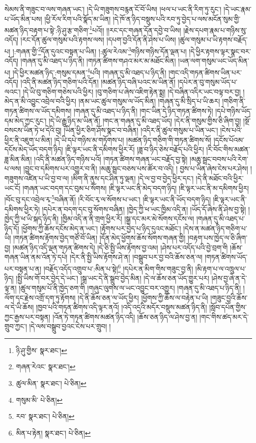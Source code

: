 སེམས་ནི་གཟུང་བ་ལས་གཞན་ཡང་། །དེ་ཡི་གཟུགས་བརྙན་ངོ་བོ་ཡིས། །ཕལ་པ་ཡང་ནི་རིག་ཏུ་རུང་། །དེ་ཡང་རྣམ་པ་ཡོད་མིན་པས། །ཕྱི་རོལ་རིག་པའི་སྣོད་མ་ཡིན། །དེ་ཁོ་ན་ཉིད་བསྡུས་པའི་རབ་ཏུ་བྱེད་པ་ལས་མངོན་སུམ་གྱི་མཚན་ཉིད་བརྟག་པ་སྟེ་:ཉི་ཤུ་རྩ་གཅིག་\footnote{ཉི་ཤུ་གྱིས་  སྣར་ཐང་། }པའོ།། །།རང་དང་གཞན་དོན་དབྱེ་བ་ཡིས། །རྗེས་དཔག་རྣམ་པ་གཉིས་སུ་འདོད། །རང་དོན་ཚུལ་གསུམ་པའི་རྟགས་ལས། །དཔག་བྱའི་དོན་ནི་ཤེས་པ་ཡིས། །ཚུལ་གསུམ་པ་ཡི་རྟགས་བརྗོད་པ། །:གཞན་གྱི་\footnote{གཞན་རེའང་  སྣར་ཐང་། }དོན་དུའང་བསྟན་པ་ཡིན། །:ཚུལ་རེའམ་\footnote{ཚུལ་མིན་  སྣར་ཐང་།  པེ་ཅིན། }གཉིས་གཉིས་དོན་ལྡན་པ། །དེ་ཕྱིར་རྟགས་ལྟར་སྣང་བར་འདོད། །གཞན་དུ་མི་འཐད་པ་ཉིད་ནི། །གཏན་ཚིགས་གཤའ་མར་མ་མཐོང་མིན། །ཡན་ལག་གསུམ་ཡང་ཡོད་མིན་པ། །དེ་ཕྱིར་མཚན་ཉིད་:གསུམ་དམན་\footnote{གསུམ་མི་  པེ་ཅིན། }པའི། །གཞན་དུ་མི་འཐད་པ་ཉིད་ནི། །གང་འདི་གཏན་ཚིགས་ཡིན་པར་འདོད། །འདི་ནི་མཚན་ཉིད་གཅིག་པའི་དོན། །མཚན་ཉིད་བཞི་པའང་མ་ཡིན་ནོ། །དཔེར་ན་བུ་གསུམ་ཡོད་པ་ལའང་། །དེ་ཡི་བུ་གཅིག་གཅེས་པའི་ཕྱིར། །བུ་གཅིག་པ་ཞེས་འཇིག་རྟེན་སྨྲ། །དེ་བཞིན་འདིར་ཡང་བལྟ་བར་བྱ། །མེད་ན་མི་འབྱུང་འབྲེལ་བའི་ཕྱིར། །ནམ་ཡང་ཚུལ་གསུམ་ལ་ཡོད་མིན། །གཞན་དུ་མི་སྲིད་པ་ཡི་ཆར། །གཅིག་ནི་གཏན་ཚིགས་ལ་ཡོད་དམིགས། །གཞན་དུ་མི་འཐད་པ་ཉིད་ནི། །གང་ཡིན་དེ་ཉིད་གཏན་ཚིགས་ཏེ། །དཔེ་གཉིས་ཡོད་དམ་མེད་ཀྱང་རུང་། །དེ་ཡི་རྒྱུ་ཉིད་མ་ཡིན་ནོ། །གང་ན་གཞན་དུ་མི་འཐད་ཡོད། །དེར་ནི་གསུམ་གྱིས་ཅི་ཞིག་བྱ། །སྔོ་བསངས་ཡིན་ཏེ་ཕ་དེའི་བུ། །ཡིན་ཕྱིར་ཅིག་ཤོས་སྣང་བ་བཞིན། །འདིར་ནི་ཚུལ་གསུམ་པ་ཡིན་ཡང་། །ངེས་པའི་ཕྱིར་ནི་འཇུག་པ་མིན། །དེ་ཡི་དཔེ་གཉིས་མ་གཏོགས་པ། །མཚན་ཉིད་གཅིག་གི་གཏན་ཚིགས་སོ། །དངོས་པོའམ་དངོས་མེད་ཡོད་བདག་ཉིད། །ཇི་ལྟར་ཡང་ནི་དམིགས་ཕྱིར་རོ། །ཟླ་བ་ཉིད་ཅེས་བརྗོད་པའི་ཕྱིར། །རི་བོང་གིས་མཚན་ཟླ་མིན་མིན། །འདི་ནི་མཚན་ཉིད་གཉིས་པའོ། །གཏན་ཚིགས་གཞན་ཡང་བརྗོད་བྱ་སྟེ། །མཆུ་སྦྲང་བབས་པའི་རེག་པ་ལས། །བྱུང་བ་དམིགས་པར་འགྱུར་བ་ནི། །མཆུ་སྦྲང་བཅས་པས་ཚོར་བ་འདི། །
བྱས་པ་ཡིན་ཞེས་ངེས་པར་ཤེས། །གཟུགས་འཛིན་པ་ཡི་བྱ་བ་ལ། །མིག་ནི་ནུས་དང་ཤིན་ཏུ་ལྡན། །དེ་ལ་བྱ་བ་བྱེད་ཕྱིར་དང་། །དེ་ནི་མཐོང་བའི་ཕྱིར་ཡང་ངོ། །གཞན་ཡང་བདག་དང་བུམ་པ་སོགས། །ཇི་ལྟར་ཡང་ནི་མེད་བདག་ཉིད། །ཇི་ལྟར་ཡང་ནི་མ་དམིགས་ཕྱིར། །བོང་བུ་དང་འབྲེལ་རྭ་\footnote{རབ་  སྣར་ཐང་།  པེ་ཅིན། }བཞིན་ནོ། །རི་བོང་རྭ་ལ་སོགས་པ་ཡང་། །ཇི་ལྟར་ཡང་ནི་ཡོད་བདག་ཉིད། །ཇི་ལྟར་ཡང་ནི་དམིགས་ཕྱིར་ཏེ། །དཔེར་ན་བདག་དང་བུ་སོགས་བཞིན། །ཁྱེད་ཀྱི་ཕ་ཡང་ཁྱིམ་འདི་ན། །ཡོད་དོ་ཞེས་ནི་ཤེས་བྱ་སྟེ། །ཁྱེད་ཀྱི་ཕ་ཡི་སྐད་ཉིད་ནི། །ཁྱིམ་འདི་ན་ནི་གྲག་ཕྱིར་རོ། །སྒྲ་དང་མར་མེ་སོགས་དངོས་ལ། །གཞན་དུ་མི་འཐད་པ་ཉིད་དོ། །ཕྱོགས་ཀྱི་ཆོས་དངོས་མེད་ན་ཡང་། །རྟོགས་པར་བྱེད་པ་ཉིད་དུའང་མཐོང་། །དེས་ན་མཚན་ཉིད་གཅིག་པ་ཡི། །གཏན་ཚིགས་རྟོགས་བྱེད་གཙོ་བོ་ཡིན། །དོན་མེད་ཕྱོགས་ཆོས་སོགས་གཞན་གྱི། །བརྟག་པས་ཁྱེད་ལ་ཅི་ཞིག་བྱ། །མཚན་ཉིད་འདི་ལྡན་གཏན་ཚིགས་དེ། །དེ་ཅི་སྤྱི་ཡིས་རྟོགས་བྱ་འམ། །ཤེས་པར་འདོད་པའི་བྱེ་བྲག་གི །ཆོས་གཞན་ཡིན་ནམ་འོན་ཏེ་དཔེ། །དེར་ནི་སྤྱི་ཡིས་རྟོགས་ཤེ་ན། །བསྒྲུབ་པར་བྱ་བའི་ཆོས་ཅན་ལ། །གཏན་ཚིགས་ཡོད་པར་བསྟན་པ་ན། །བརྗོད་འདོད་འགྲུབ་པ་:མིན་པ་སྟེ།\footnote{མིན་པ་རྟེན།  སྣར་ཐང་།  པེ་ཅིན། } །དཔེར་ན་མིག་གིས་གཟུང་བྱ་ནི། །མི་རྟག་པ་ལ་འཁྲུལ་པ་ཉིད། །སྤྱི་ཡིས་གོ་བར་བྱེད་དེ་ཡང་། །སྒྲ་ཡང་དེ་ནི་སྒྲུབ་བྱེད་མིན། །དེ་ལ་ཆོས་ཅན་ཡོད་གྱུར་པར། །ཤེས་བྱ་ཞེ་ན་དེ་ལྟ་ན། །ཚུལ་གསུམ་པོ་ནི་ཁྱེད་ཅག་གི །གཞུང་ལུགས་ལ་ཡང་འབྱུང་བར་འགྱུར། །གཞན་དུ་མི་འཐད་པ་ཉིད་ནི། །ལོག་དང་རྗེས་འགྲོ་དག་ཏུ་རྟོགས། །དེ་ནི་ཆོས་ཅན་ལ་ཡོད་ཕྱིར། །ཕྱོགས་ཀྱི་ཆོས་ལ་བརྟེན་པ་ཡི། །གཟུང་བྱའི་ཆོས་ལ་དེ་ཡི་ཆོས། །ཁྱབ་པའི་གཏན་ཚིགས་འདི་ལྟར་ནའོ། །འདི་འདྲའི་མདོར་བསྡུས་མཚན་ཉིད་ནི། །སློབ་དཔོན་གྱིས་ཀྱང་རྒྱས་པར་བསྟན། །འོན་ཏེ་གཏན་ཚིགས་མཚན་ཉིད་འདི། །ཆོས་ཅན་ཉིད་ལ་ཤེས་བྱ་ན། །གང་གིས་ཚད་མར་དེ་གྲུབ་ཀྱང་། །དེ་ལས་བསྒྲུབ་བྱའང་ངེས་པར་གྲུབ། །
